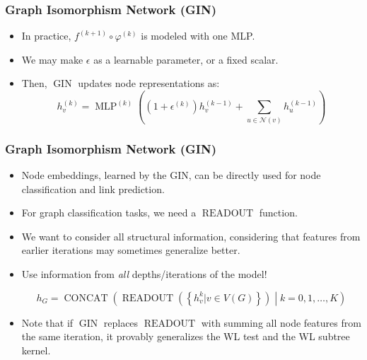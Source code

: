 \documentclass{beamer}
\DeclareMathOperator{\readout}{READOUT}
\DeclareMathOperator{\concat}{CONCAT}
\DeclareMathOperator{\mlp}{MLP}
\DeclareMathOperator{\gin}{GIN}
\begin{document}
\begin{frame}
\frametitle{Graph Isomorphism Network (GIN)}

\begin{itemize}
	\item In practice, $f^{(k + 1)} \circ \varphi^{(k)}$ is modeled with one MLP.\pause
	
	\item We may make $\epsilon$ as a learnable parameter, or a fixed scalar.\pause
	
	\item Then, $\gin$ updates node representations as:
	$$h_v^{(k)} = \mlp^{(k)} \left( \left(1 + \epsilon^{(k)} \right) h_v^{(k - 1)} + \sum_{u \in \mathscr{N}(v)} h_u^{(k - 1)} \right)$$
\end{itemize}

\end{frame}


\begin{frame}
\frametitle{Graph Isomorphism Network (GIN)}

\begin{itemize}
	\item Node embeddings, learned by the GIN, can be directly used for node classification and link prediction. \pause
	
	\item For graph classification tasks, we need a $\readout$ function. \pause
	
	\item We want to consider all structural information, considering that features from earlier iterations may sometimes generalize better. \pause
	
	\item Use information from {\it all} depths/iterations of the model!
	
	$$h_G = \concat \left( \readout \left( \left\{ h_v^{k} | v \in V(G) \right\} \right) \middle| k = 0, 1, \dots, K \right)$$ \pause
	
	\item Note that if $\gin$ replaces $\readout$ with summing all node features from the same iteration, it provably generalizes the WL test and the WL subtree kernel.
\end{itemize}

\end{frame}
\end{document}

